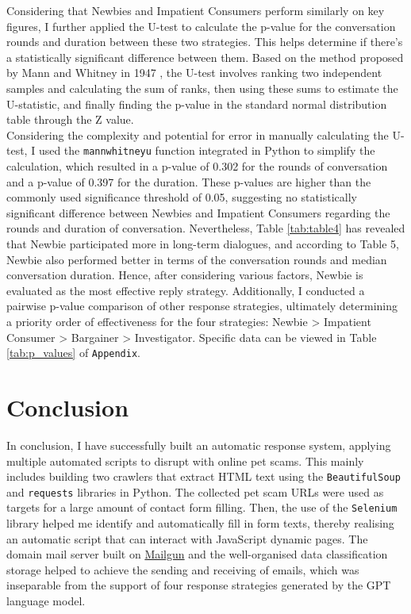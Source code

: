 \documentclass[ oneside,%
                    author={Cassie Qing Tang},
                    degree={BSc},
                     title={An Automated Response System for Disrupting Online Pet Scamming \\ },
                    subtitle={ }]{dissertation}
\begin{document}
Considering that Newbies and Impatient Consumers perform similarly on key figures, I further applied the U-test to calculate the p-value for the conversation rounds and duration between these two strategies. This helps determine if there's a statistically significant difference between them. Based on the method proposed by Mann and Whitney in 1947 \cite{mann_test_1947}, the U-test involves ranking two independent samples and calculating the sum of ranks, then using these sums to estimate the U-statistic, and finally finding the p-value in the standard normal distribution table through the Z value.
\\

Considering the complexity and potential for error in manually calculating the U-test, I used the \texttt{mannwhitneyu} function \cite{noauthor_scipystatsmannwhitneyu_nodate} integrated in Python to simplify the calculation, which resulted in a p-value of 0.302 for the rounds of conversation and a p-value of 0.397 for the duration. These p-values are higher than the commonly used significance threshold of 0.05, suggesting no statistically significant difference between Newbies and Impatient Consumers regarding the rounds and duration of conversation. Nevertheless, Table \ref{tab:table4} has revealed that Newbie participated more in long-term dialogues, and according to Table 5, Newbie also performed better in terms of the conversation rounds and median conversation duration. Hence, after considering various factors, Newbie is evaluated as the most effective reply strategy. Additionally, I conducted a pairwise p-value comparison of other response strategies, ultimately determining a priority order of effectiveness for the four strategies: Newbie \textgreater{} Impatient Consumer \textgreater{} Bargainer \textgreater{} Investigator. Specific data can be viewed in Table \ref{tab:p_values} of \texttt{Appendix}.


\chapter{Conclusion}
In conclusion, I have successfully built an automatic response system, applying multiple automated scripts to disrupt with online pet scams. This mainly includes building two crawlers that extract HTML text using the \texttt{BeautifulSoup} and \texttt{requests} libraries in Python. The collected pet scam URLs were used as targets for a large amount of contact form filling. Then, the use of the \texttt{Selenium} library helped me identify and automatically fill in form texts, thereby realising an automatic script that can interact with JavaScript dynamic pages. The domain mail server built on \href{www.mailgun.com}{Mailgun} and the well-organised data classification storage helped to achieve the sending and receiving of emails, which was inseparable from the support of four response strategies generated by the GPT language model.
\\
\end{document}
